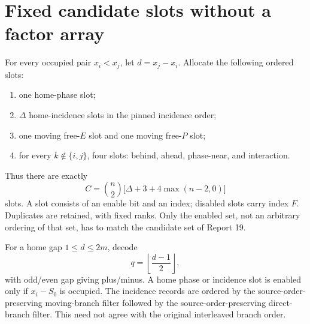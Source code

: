 \documentclass[11pt,a4paper]{article}
\numberwithin{equation}{section}
\begin{document}
\section{Fixed candidate slots without a factor array}\label{fpa:eb:sec:candidates}
For every occupied pair $x_i<x_j$, let $d=x_j-x_i$. Allocate the following ordered slots:
\begin{enumerate}
\item one home-phase slot;
\item $\Delta$ home-incidence slots in the pinned incidence order;
\item one moving free-$E$ slot and one moving free-$P$ slot;
\item for every $k\notin\{i,j\}$, four slots: behind, ahead, phase-near, and interaction.
\end{enumerate}
Thus there are exactly
\begin{equation}\label{fpa:eb:eq:C}
C=\binom n2\bigl[\Delta+3+4\max(n-2,0)\bigr]
\end{equation}
slots. A slot consists of an enable bit and an index; disabled slots carry index $F$. Duplicates are retained, with fixed ranks. Only the enabled set, not an arbitrary ordering of that set, has to match the candidate set of Report 19.

For a home gap $1\leq d\leq2m$, decode
\[
q=\left\lfloor\frac{d-1}{2}\right\rfloor,
\]
with odd/even gap giving plus/minus. A home phase or incidence slot is enabled only if $x_i-S_0$ is occupied. The incidence records are ordered by the source-order-preserving moving-branch filter followed by the source-order-preserving direct-branch filter. This need not agree with the original interleaved branch order.
\end{document}
